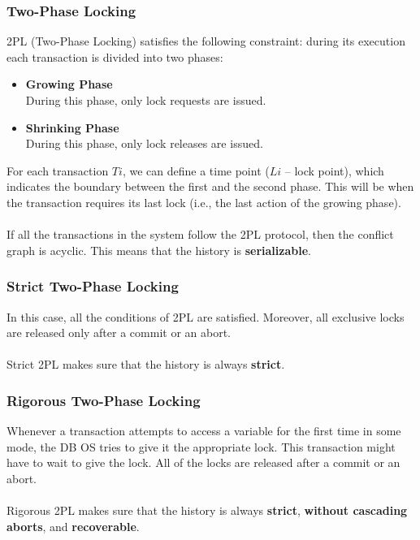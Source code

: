 \documentclass{article}
\begin{document}
\subsubsection{Two-Phase Locking}
2PL (Two-Phase Locking) satisfies the following constraint: during its execution each transaction is divided into two phases:

\begin{itemize}
	\item \textbf{Growing Phase}
	\vspace{.2cm} \\
	During this phase, only lock requests are issued.
	
	\item \textbf{Shrinking Phase}
	\vspace{.2cm} \\
	During this phase, only lock releases are issued.
\end{itemize}
For each transaction $Ti$, we can define a time point ($Li$ -- lock point), which indicates the boundary between the first and the second phase. This will be when the transaction requires its last lock (i.e., the last action of the growing phase). \\ \\
If all the transactions in the system follow the 2PL protocol, then the conflict graph is acyclic. This means that the history is \textbf{serializable}.

\subsubsection{Strict Two-Phase Locking}
In this case, all the conditions of 2PL are satisfied. Moreover, all exclusive locks are released only after a commit or an abort. \\ \\
Strict 2PL makes sure that the history is always \textbf{strict}.

\subsubsection{Rigorous Two-Phase Locking}
Whenever a transaction attempts to access a variable for the first time in some mode, the DB OS tries to give it the appropriate lock. This transaction might have to wait to give the lock. All of the locks are released after a commit or an abort. \\ \\
Rigorous 2PL makes sure that the history is always \textbf{strict}, \textbf{without cascading aborts}, and \textbf{recoverable}.
\end{document}
